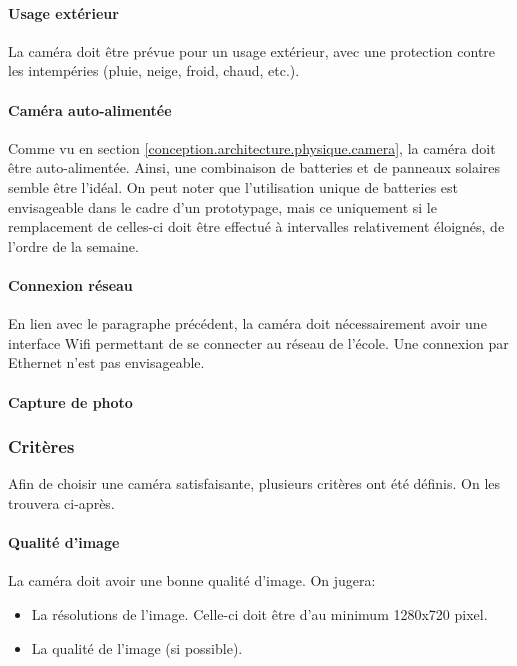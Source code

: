\paragraph{Usage extérieur}
La caméra doit être prévue pour un usage extérieur, avec une protection contre les intempéries (pluie, neige, froid, chaud, etc.).

\paragraph{Caméra auto-alimentée}
Comme vu en section \ref{conception.architecture.physique.camera}, la caméra doit être auto-alimentée. Ainsi, une combinaison de batteries et de panneaux solaires semble être l'idéal. On peut noter que l'utilisation unique de batteries est envisageable dans le cadre d'un prototypage, mais ce uniquement si le remplacement de celles-ci doit être effectué à intervalles relativement éloignés, de l'ordre de la semaine.

\paragraph{Connexion réseau}
En lien avec le paragraphe précédent, la caméra doit nécessairement avoir une interface Wifi permettant de se connecter au réseau de l'école. Une connexion par Ethernet n'est pas envisageable.

\paragraph{Capture de photo}


\subsubsection{Critères}
Afin de choisir une caméra satisfaisante, plusieurs critères ont été définis. On les trouvera ci-après.

\paragraph{Qualité d'image}
La caméra doit avoir une bonne qualité d'image. On jugera:
\begin{itemize}
    \item La résolutions de l'image. Celle-ci doit être d'au minimum 1280x720 pixel.
    \item La qualité de l'image (si possible).
\end{itemize}


